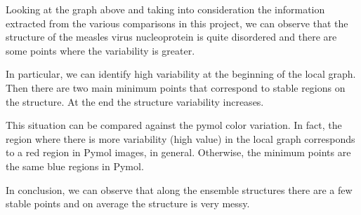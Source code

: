 \medskip
Looking at the graph above and taking into consideration the information extracted from the various comparisons in this project, we can observe that the structure of the measles virus nucleoprotein is quite disordered and there are some points where the variability is greater. 

In particular, we can identify high variability at the beginning of the local graph. Then there are two main minimum points that correspond to stable regions on the structure. At the end the structure variability increases.

This situation can be compared against the pymol color variation. In fact, the region where there is more variability (high value) in the local graph corresponds to a red region in Pymol images, in general. Otherwise, the minimum points are the same blue regions in Pymol.

In conclusion, we can observe that along the ensemble structures there are a few stable points and on average the structure is very messy.

